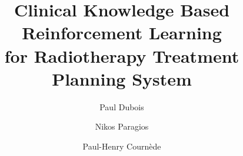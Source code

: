 \documentclass[11pt,twocolumn,twoside]{article}
\begin{document}
\title{Clinical Knowledge Based Reinforcement Learning\\for Radiotherapy Treatment Planning System}

\author[1,2]{Paul Dubois}
\author[1]{Nikos Paragios}
\author[2]{Paul-Henry Cournède}



\maketitle
\thispagestyle{fancy}





\begin{customabstract}
	
\end{customabstract}







 
\end{document}
